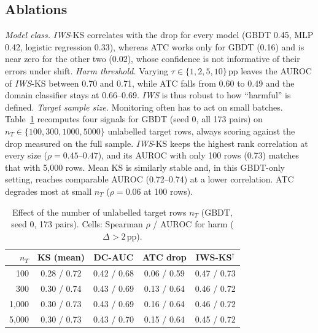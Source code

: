 \documentclass[conference]{IEEEtran}
\theoremstyle{plainhead}
\newcommand{\iws}{\textit{IWS}}
\newcommand{\pp}{\,pp\xspace}
\begin{document}
\subsection{Ablations}
\label{sec:ablation}
\textit{Model class.} \iws{}-KS correlates with the drop for every model (GBDT 0.45, MLP 0.42, logistic regression 0.33), whereas ATC works only for GBDT (0.16) and is near zero for the other two (0.02), whose confidence is not informative of their errors under shift.
\textit{Harm threshold.} Varying $\tau\in\{1,2,5,10\}$\pp leaves the AUROC of \iws{}-KS between 0.70 and 0.71, while ATC falls from 0.60 to 0.49 and the domain classifier stays at 0.66--0.69. \iws{} is thus robust to how ``harmful'' is defined.
\textit{Target sample size.} Monitoring often has to act on small batches. Table~\ref{tab:nsize} recomputes four signals for GBDT (seed 0, all 173 pairs) on $n_T\in\{100,300,1000,5000\}$ unlabelled target rows, always scoring against the drop measured on the full sample. \iws{}-KS keeps the highest rank correlation at every size ($\rho=0.45$--$0.47$), and its AUROC with only 100 rows (0.73) matches that with 5{,}000 rows. Mean KS is similarly stable and, in this GBDT-only setting, reaches comparable AUROC (0.72--0.74) at a lower correlation. ATC degrades most at small $n_T$ ($\rho=0.06$ at 100 rows).

\begin{table}[t]
\centering
\caption{Effect of the number of unlabelled target rows $n_T$ (GBDT, seed 0, 173 pairs). Cells: Spearman $\rho$ / AUROC for harm ($\Delta>2$\pp).}
\label{tab:nsize}
\footnotesize
\setlength{\tabcolsep}{3.5pt}
\begin{tabular}{rcccc}
\toprule
$n_T$ & KS (mean) & DC-AUC & ATC drop & IWS-KS$^\dagger$ \\
\midrule
100 & 0.28 / 0.72 & 0.42 / 0.68 & 0.06 / 0.59 & 0.47 / 0.73 \\
300 & 0.30 / 0.74 & 0.43 / 0.69 & 0.13 / 0.64 & 0.46 / 0.72 \\
1{,}000 & 0.30 / 0.73 & 0.43 / 0.69 & 0.16 / 0.64 & 0.46 / 0.72 \\
5{,}000 & 0.30 / 0.73 & 0.43 / 0.70 & 0.15 / 0.64 & 0.45 / 0.72 \\
\bottomrule
\end{tabular}
\end{table}

\end{document}
